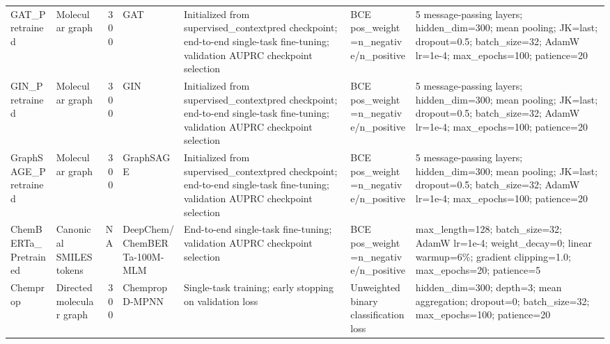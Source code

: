 \begin{longtable}{llrllll}
GAT\_Pretrained & Molecular graph & 300 & GAT & Initialized from supervised\_contextpred checkpoint; end-to-end single-task fine-tuning; validation AUPRC checkpoint selection & BCE pos\_weight=n\_negative/n\_positive & 5 message-passing layers; hidden\_dim=300; mean pooling; JK=last; dropout=0.5; batch\_size=32; AdamW lr=1e-4; max\_epochs=100; patience=20 \\
GIN\_Pretrained & Molecular graph & 300 & GIN & Initialized from supervised\_contextpred checkpoint; end-to-end single-task fine-tuning; validation AUPRC checkpoint selection & BCE pos\_weight=n\_negative/n\_positive & 5 message-passing layers; hidden\_dim=300; mean pooling; JK=last; dropout=0.5; batch\_size=32; AdamW lr=1e-4; max\_epochs=100; patience=20 \\
GraphSAGE\_Pretrained & Molecular graph & 300 & GraphSAGE & Initialized from supervised\_contextpred checkpoint; end-to-end single-task fine-tuning; validation AUPRC checkpoint selection & BCE pos\_weight=n\_negative/n\_positive & 5 message-passing layers; hidden\_dim=300; mean pooling; JK=last; dropout=0.5; batch\_size=32; AdamW lr=1e-4; max\_epochs=100; patience=20 \\
ChemBERTa\_Pretrained & Canonical SMILES tokens & NA & DeepChem/ChemBERTa-100M-MLM & End-to-end single-task fine-tuning; validation AUPRC checkpoint selection & BCE pos\_weight=n\_negative/n\_positive & max\_length=128; batch\_size=32; AdamW lr=1e-4; weight\_decay=0; linear warmup=6\%; gradient clipping=1.0; max\_epochs=20; patience=5 \\
Chemprop & Directed molecular graph & 300 & Chemprop D-MPNN & Single-task training; early stopping on validation loss & Unweighted binary classification loss & hidden\_dim=300; depth=3; mean aggregation; dropout=0; batch\_size=32; max\_epochs=100; patience=20 \\
\end{longtable}
